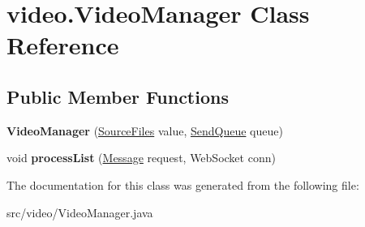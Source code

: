 \hypertarget{classvideo_1_1_video_manager}{
\section{video.VideoManager Class Reference}
\label{classvideo_1_1_video_manager}
}
\subsection*{Public Member Functions}
\begin{DoxyCompactItemize}
\item 
\hypertarget{classvideo_1_1_video_manager_ac200501339327f9e7d620192c926c0b4}{
{\bfseries VideoManager} (\hyperlink{interfaceserver_1_1_source_files}{SourceFiles} value, \hyperlink{classvideo_1_1_send_queue}{SendQueue} queue)}
\label{classvideo_1_1_video_manager_ac200501339327f9e7d620192c926c0b4}

\item 
\hypertarget{classvideo_1_1_video_manager_a024cf074b500579ac5c21801b9a71bd5}{
void {\bfseries processList} (\hyperlink{classjson__objects_1_1_message}{Message} request, WebSocket conn)}
\label{classvideo_1_1_video_manager_a024cf074b500579ac5c21801b9a71bd5}

\end{DoxyCompactItemize}


The documentation for this class was generated from the following file:\begin{DoxyCompactItemize}
\item 
src/video/VideoManager.java\end{DoxyCompactItemize}
